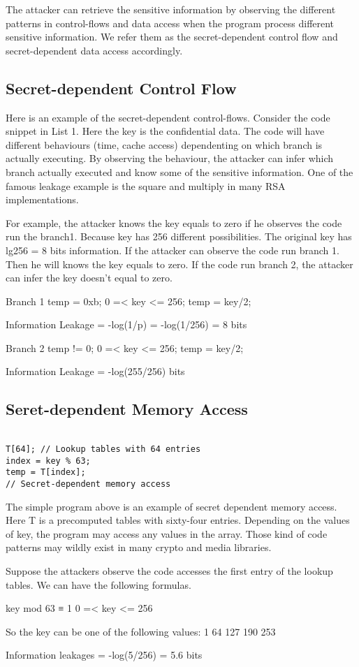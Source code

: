 The attacker can retrieve the sensitive information by observing the different patterns in control-flows and data access when the program process different sensitive information. We refer them as the secret-dependent control flow and secret-dependent data access accordingly.

\subsection{Secret-dependent Control Flow}
Here is an example of the secret-dependent control-flows. Consider the code snippet in List 1. Here the key is the confidential data. The code will have different behaviours (time, cache access) dependenting on which branch is actually executing. By observing the behaviour, the attacker can infer which branch actually executed and know some of the sensitive information. One of the famous leakage example is the square and multiply in many RSA implementations. 

For example, the attacker knows the key equals to zero if he observes the code run the branch1. Because key has 256 different possibilities. The original key has lg256 = 8 bits information. If the attacker can observe the code run branch 1. Then he will knows the key equals to zero. If the code run branch 2, the attacker can infer the key doesn’t equal to zero. 

Branch 1
temp = 0xb;
0 =< key <= 256;
temp = key/2;

Information Leakage = -log(1/p) = -log(1/256) = 8 bits

Branch 2
temp != 0; 
0 =< key <= 256;
temp = key/2;

Information Leakage = -log(255/256) bits

\subsection{Seret-dependent Memory Access}

\begin{lstlisting}

T[64]; // Lookup tables with 64 entries
index = key % 63;
temp = T[index]; 
// Secret-dependent memory access       

\end{lstlisting}

The simple program above is an example of secret dependent memory access. Here T is a precomputed tables with sixty-four entries. Depending on the values of key, the program may access any values in the array. Those kind of code patterns may wildly exist in many crypto and media libraries. 

Suppose the attackers observe the code accesses the first entry of the lookup tables. We can have the following formulas.

key mod 63 ≡ 1
0 =< key <= 256

So the key can be one of the following values:
1 64 127 190 253

Information leakages = -log(5/256) =  5.6 bits

